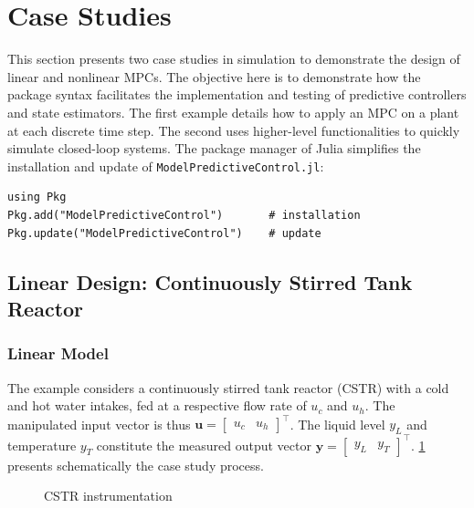\section{Case Studies}
\label{sec:case_studies}

This section presents two case studies in simulation to demonstrate the design of linear and nonlinear MPCs. The objective here is to demonstrate how the package syntax facilitates the implementation and testing of predictive controllers and state estimators. The first example details how to apply an MPC on a plant at each discrete time step. The second uses higher-level functionalities to quickly simulate closed-loop systems. The package manager of Julia simplifies the installation and update of \texttt{ModelPredictiveControl.jl}:
\begin{verbatim}
using Pkg
Pkg.add("ModelPredictiveControl")       # installation
Pkg.update("ModelPredictiveControl")    # update
\end{verbatim}

\subsection{Linear Design: Continuously Stirred Tank Reactor}

\subsubsection{Linear Model}

The example considers a continuously stirred tank reactor (CSTR) with a cold and hot water intakes, fed at a respective flow rate of $u_c$ and $u_h$. The manipulated input vector is thus $\mathbf{u} = [\begin{smallmatrix}u_c & u_h\end{smallmatrix}]^\intercal$. The liquid level $y_L$ and temperature $y_T$ constitute the measured output vector $\mathbf{y} = [\begin{smallmatrix}y_L & y_T\end{smallmatrix}]^\intercal$. \cref{fig:cstr} presents schematically the case study process.

\begin{figure}[h]
    \centering
    
    \caption{CSTR instrumentation}
    \label{fig:cstr}
\end{figure}

